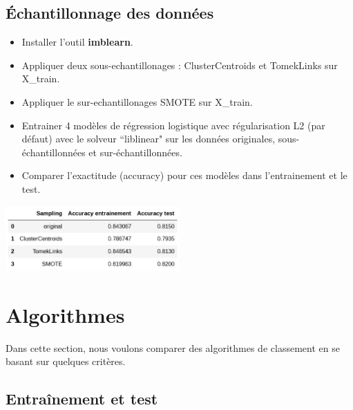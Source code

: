 \documentclass[12pt, a4paper]{article}
\begin{document}
\subsection{Échantillonnage des données}

\begin{itemize}
	\item Installer l'outil \textbf{imblearn}.
	\item Appliquer deux sous-echantillonages : ClusterCentroids et TomekLinks sur X\_train.
	\item Appliquer le sur-echantillonages SMOTE sur X\_train.
	\item Entrainer 4 modèles de régression logistique avec régularisation L2 (par défaut) avec le solveur ``liblinear" sur les données originales, sous-échantillonnées et sur-échantillonnées.
	\item Comparer l'exactitude (accuracy) pour ces modèles dans l'entrainement et le test.
\end{itemize}

\begin{center}
	\includegraphics[width=0.5\textwidth]{../img/workshop/sampling.png}
\end{center}

\section{Algorithmes}

Dans cette section, nous voulons comparer des algorithmes de classement en se basant sur quelques critères.

\subsection{Entraînement et test}
\end{document}
